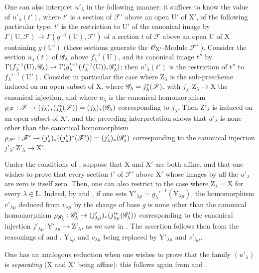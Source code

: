 \begin{env}[11.9.5]
One can also interpret $u'_\lambda$ in the following manner: it suffices to know the value of $u'_\lambda(t')$, where $t'$ is a section of $\mathscr{F}'$ above an open $\mathrm{U}'$ of $\mathrm{X}'$, of the following particular type: $t'$ is the restriction to $\mathrm{U}'$ of the canonical image by $\Gamma(\mathrm{U},\mathscr{F})\to\Gamma(g^{-1}(\mathrm{U}),\mathscr{F}')$ of a section $t$ of $\mathscr{F}$ above an open $\mathrm{U}$ of $\mathrm{X}$ containing $g(\mathrm{U}')$ (these sections generate the $\mathscr{O}_{\mathrm{X}'}$-Module $\mathscr{F}'$ ).
Consider the section $u_\lambda(t)$ of $\mathscr{G}_\lambda$ above $f_\lambda^{-1}(\mathrm{U})$, and its canonical image $t''$ by $\Gamma(f_\lambda^{-1}(\mathrm{U}),\mathscr{G}_\lambda)\to\Gamma(g_\lambda'^{-1}(f_\lambda^{-1}(\mathrm{U})),\mathscr{G}'_\lambda)$; then $u'_\lambda(t')$ is the restriction of $t''$ to $f_\lambda'^{-1}(\mathrm{U}')$.
Consider in particular the case where $\mathrm{Z}_\lambda$ is the sub-prescheme induced on an open subset of $\mathrm{X}$, where $\mathscr{G}_\lambda=j_\lambda^*(\mathscr{F})$, with $j_\lambda:\mathrm{Z}_\lambda\to\mathrm{X}$ the canonical injection, and where $u_\lambda$ is the canonical homomorphism $\rho_\mathscr{F}:\mathscr{F}\to(j_\lambda)_*(j_\lambda^*(\mathscr{F}))=(j_\lambda)_*(\mathscr{G}_\lambda)$  corresponding to $j_\lambda$.
Then $\mathrm{Z}'_\lambda$ is induced on an open subset of $\mathrm{X}'$, and the preceding interpretation shows that $u'_\lambda$ is none other than the canonical homomorphism $\rho_{\mathscr{F}'}:\mathscr{F}'\to(j'_\lambda)_*((j'_\lambda)^*(\mathscr{F}'))=(j'_\lambda)_*(\mathscr{G}'_\lambda)$ corresponding to the canonical injection $j'_\lambda:\mathrm{Z}'_\lambda\to\mathrm{X}'$.
\end{env}

\begin{env}[11.9.6]
\label{IV.11.9.6}
Under the conditions of , suppose that $\mathrm{X}$ and $\mathrm{X}'$ are both affine, and that one wishes to prove that every section $t'$ of $\mathscr{F}'$ above $\mathrm{X}'$ whose images by all the $u'_\lambda$ are zero is itself zero.
Then, one can also restrict to the case where $\mathrm{Z}_\lambda=\mathrm{X}$ for every $\lambda\in\mathrm{L}$.
Indeed, by  and , if one sets $\mathrm{Y}'_{\lambda\mu}=g_\lambda'^{-1}(\mathrm{Y}_{\lambda\mu})$, the homomorphism $v'_{\lambda\mu}$ deduced from $v_{\lambda\mu}$ by the change of base $g$ is none other than the canonical homomorphism
$\rho_{\mathscr{G}'_\lambda}:\mathscr{G}'_\lambda\to(j'_{\lambda\mu})_*(j_{\lambda\mu}'^*(\mathscr{G}'_\lambda))$ corresponding to the canonical injection $j'_{\lambda\mu}:\mathrm{Y}'_{\lambda\mu}\to\mathrm{Z}'_\lambda$, as we saw in .
The assertion follows then from the reasonings of  and , $\mathrm{Y}_{\lambda\mu}$ and $v_{\lambda\mu}$ being replaced by $\mathrm{Y}'_{\lambda\mu}$ and $v'_{\lambda\mu}$.

One has an analogous reduction when one wishes to prove that the family $(u'_\lambda)$ is \emph{separating} ($\mathrm{X}$ and $\mathrm{X}'$ being affine): this follows again from  and .
\end{env}

